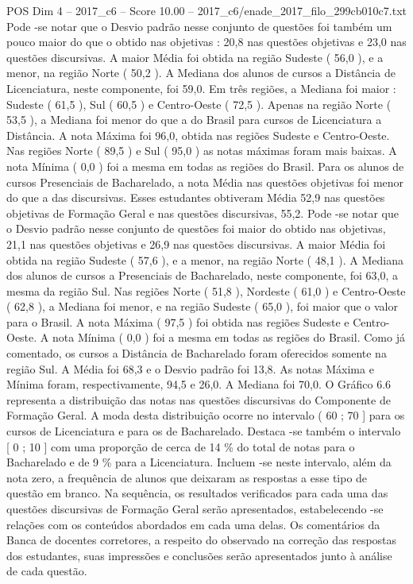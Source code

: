 \begin{textsample}{POS Dim 4 – 2017\_c6 – Score 10.00 – 2017\_c6/enade\_2017\_filo\_299cb010c7.txt}
Pode -se notar que o Desvio padrão nesse conjunto de questões foi também um pouco maior do que o obtido nas objetivas : 20,8 nas questões objetivas e 23,0 nas questões discursivas.
A maior Média foi obtida na região Sudeste ( 56,0 ), e a menor, na região Norte ( 50,2 ).
A Mediana dos alunos de cursos a Distância de Licenciatura, neste componente, foi 59,0.
Em três regiões, a Mediana foi maior : Sudeste ( 61,5 ), Sul ( 60,5 ) e Centro-Oeste ( 72,5 ).
Apenas na região Norte ( 53,5 ), a Mediana foi menor do que a do Brasil para cursos de Licenciatura a Distância.
A nota Máxima foi 96,0, obtida nas regiões Sudeste e Centro-Oeste.
Nas regiões Norte ( 89,5 ) e Sul ( 95,0 ) as notas máximas foram mais baixas.
A nota Mínima ( 0,0 ) foi a mesma em todas as regiões do Brasil.
Para os alunos de cursos Presenciais de Bacharelado, a nota Média nas questões objetivas foi menor do que a das discursivas.
Esses estudantes obtiveram Média 52,9 nas questões objetivas de Formação Geral e nas questões discursivas, 55,2.
Pode -se notar que o Desvio padrão nesse conjunto de questões foi maior do obtido nas objetivas, 21,1 nas questões objetivas e 26,9 nas questões discursivas.
A maior Média foi obtida na região Sudeste ( 57,6 ), e a menor, na região Norte ( 48,1 ).
A Mediana dos alunos de cursos a Presenciais de Bacharelado, neste componente, foi 63,0, a mesma da região Sul.
Nas regiões Norte ( 51,8 ), Nordeste ( 61,0 ) e Centro-Oeste ( 62,8 ), a Mediana foi menor, e na região Sudeste ( 65,0 ), foi maior que o valor para o Brasil.
A nota Máxima ( 97,5 ) foi obtida nas regiões Sudeste e Centro-Oeste.
A nota Mínima ( 0,0 ) foi a mesma em todas as regiões do Brasil.
Como já comentado, os cursos a Distância de Bacharelado foram oferecidos somente na região Sul.
A Média foi 68,3 e o Desvio padrão foi 13,8.
As notas Máxima e Mínima foram, respectivamente, 94,5 e 26,0.
A Mediana foi 70,0.
O Gráfico 6.6 representa a distribuição das notas nas questões discursivas do Componente de Formação Geral.
A moda desta distribuição ocorre no intervalo ( 60 ; 70 ] para os cursos de Licenciatura e para os de Bacharelado.
Destaca -se também o intervalo [ 0 ; 10 ] com uma proporção de cerca de 14 \% do total de notas para o Bacharelado e de 9 \% para a Licenciatura.
Incluem -se neste intervalo, além da nota zero, a frequência de alunos que deixaram as respostas a esse tipo de questão em branco.
Na sequência, os resultados verificados para cada uma das questões discursivas de Formação Geral serão apresentados, estabelecendo -se relações com os conteúdos abordados em cada uma delas.
Os comentários da Banca de docentes corretores, a respeito do observado na correção das respostas dos estudantes, suas impressões e conclusões serão apresentados junto à análise de cada questão.

\end{textsample}
